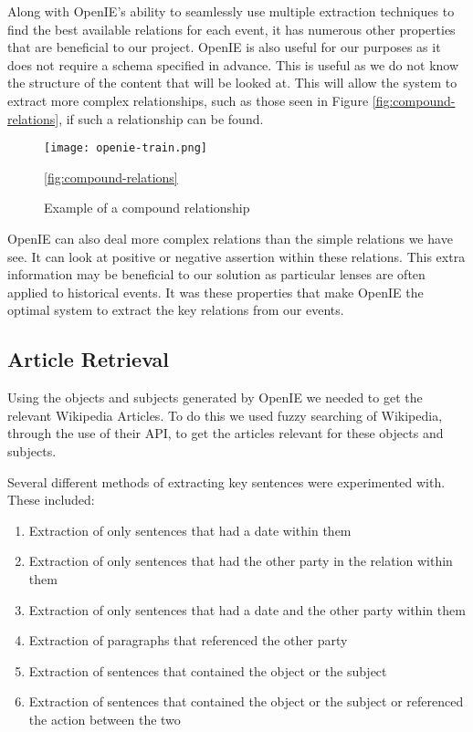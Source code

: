 \documentclass[bsc,frontabs,twoside,singlespacing,parskip,deptreport]{infthesis}     %
\begin{document}
Along with OpenIE's ability to seamlessly use multiple extraction techniques to find the best available
relations for each event, it has numerous other properties that are beneficial to our project.
OpenIE is also useful for our purposes as it does not require a schema specified in advance.
This is useful as we do not know the structure of the content that will be looked at.
This will allow the system to extract
more complex relationships, such as those seen in Figure \ref{fig:compound-relations}, if such
a relationship can be found.


\begin{figure}[h]
  \centering
  \texttt{[image: openie-train.png]}
  \caption{Example of a compound relationship \cite{OpenIE}}
  \ref{fig:compound-relations}
  \end{figure}

OpenIE can also deal more complex relations  than the simple relations we have see.
It can look at positive or negative assertion within these relations.
This extra information may be beneficial to our solution as particular lenses are often applied to historical events.
It was these properties that make OpenIE the optimal system to extract the key relations from our events.


\subsection{Article Retrieval}
Using the objects and subjects generated by OpenIE we needed to get the relevant Wikipedia Articles.
To do this we used fuzzy searching of Wikipedia, through the use of their API, to get the articles relevant
for these objects and subjects.

Several different methods of extracting key sentences were experimented with.
These included:
\begin{enumerate}
  \item Extraction of only sentences that had a date within them
  \item Extraction of only sentences that had the other party in the relation within them
  \item Extraction of only sentences that had a date and the other party within them
  \item Extraction of paragraphs that referenced the other party
  \item Extraction of sentences that contained the object or the subject 
  \item Extraction of sentences that contained the object or the subject or referenced the action between the two 
\end{enumerate}
\end{document}
